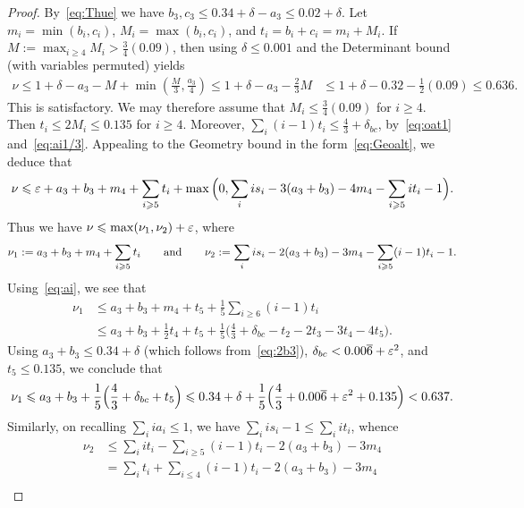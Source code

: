 \begin{proof}
  \leanok

  By~\eqref{eq:Thue} we have $b_3,c_3\le 0.34+\delta-a_3\le 0.02+\delta$.
  Let $m_i=\min(b_i,c_i)$, $M_i=\max(b_i,c_i)$, and $t_i=b_i+c_i=m_i+M_i$.
  If $M :=\max_{i\ge4}M_i > \frac{3}{4}(0.09)$, then using $\delta\leq 0.001$ and the Determinant bound (with variables permuted) yields
  \begin{align*}
  \nu \le 1 +\delta- a_3 - M + \min\left(\frac{M}{3}, \frac{a_3}{4}\right)
  \le 1+\delta - a_3 - \frac{2}{3}M
  &\le 1+\delta-0.32 - \frac{1}{2}(0.09) \le 0.636.
  \end{align*}
  This is satisfactory.
  We may therefore assume that $M_i\le \frac{3}{4}(0.09)$ for $i\ge4$. Then $t_i\le 2M_i\le 0.135$ for $i\ge4$.
  Moreover, $\sum_{i}(i-1)t_i \le \frac{4}{3}+\delta_{bc}$, by~\eqref{eq:oat1}
  and~\eqref{eq:ai1/3}.
  Appealing to the Geometry bound in the form~\eqref{eq:Geoalt}, we deduce that
  \begin{align*}
  \nu \le \eps + a_3+b_3 + m_4+\sum_{i\ge5}t_i + \max\Big(0 , \sum_i is_i - 3(a_3+b_3) - 4m_4-\sum_{i\ge5}it_i - 1\Big).
  \end{align*}
  Thus we have $\nu \le \max(\nu_1,\nu_2)+\eps$, where
  \begin{align*}
  \nu_1 := a_3+b_3 + m_4+\sum_{i\ge5}t_i
  \qquad{\rm and}\qquad
  \nu_2
  := \sum_i is_i -2(a_3+b_3) - 3m_4 - \sum_{i\ge5}(i-1)t_i -1.
  \end{align*}
  Using~\eqref{eq:ai}, we see that
  \begin{align*}
  \nu_1 &\le a_3+b_3 +m_4+t_5+\frac{1}{5}\sum_{i\ge6}(i-1)t_i\\
  & \le a_3 + b_3 + \frac{1}{2}t_4+t_5+\frac{1}{5}\Big(\frac{4}{3}+\delta_{bc}-t_2-2t_3- 3t_4-4t_5\Big).
  \end{align*}
  Using $a_3+b_3\le 0.34+\delta$ (which follows from~\eqref{eq:2b3}), $\delta_{bc}<0.00\overline{6}+\eps^2$, and $t_5\le 0.135$, we conclude that
  \[
  \nu_1 \le a_3+b_3 + \frac{1}{5}\Big(\frac{4}{3}+\delta_{bc}+t_5\Big)
  \le 0.34+ \delta + \frac{1}{5}\Big(\frac{4}{3}+0.00\overline{6}+\eps^2+0.135\Big) < 0.637.
  \]
  Similarly, on recalling $\sum_i i a_i \le 1$, we have $\sum_i is_i -1 \le \sum_i it_i$, whence
  \begin{align*}
  \nu_2
  &\le \sum_i it_i - \sum_{i\ge5}(i-1)t_i -2(a_3+b_3) - 3m_4\\
  &= \sum_{i} t_i + \sum_{i\le4}(i-1)t_i -2(a_3+b_3) - 3m_4\\

\end{align*}
\end{proof}
